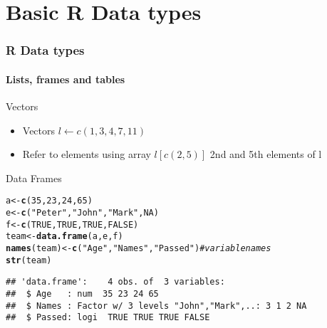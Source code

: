 \documentclass{article}\usepackage[]{graphicx}\usepackage[]{color}
\makeatletter
\newcommand{\hlnum}[1]{\textcolor[rgb]{0.686,0.059,0.569}{#1}}%
\newcommand{\hlstr}[1]{\textcolor[rgb]{0.192,0.494,0.8}{#1}}%
\newcommand{\hlcom}[1]{\textcolor[rgb]{0.678,0.584,0.686}{\textit{#1}}}%
\newcommand{\hlstd}[1]{\textcolor[rgb]{0.345,0.345,0.345}{#1}}%
\newcommand{\hlkwb}[1]{\textcolor[rgb]{0.69,0.353,0.396}{#1}}%
\newcommand{\hlkwd}[1]{\textcolor[rgb]{0.737,0.353,0.396}{\textbf{#1}}}%
\newenvironment{kframe}{%
 \def\at@end@of@kframe{}%
 \ifinner\ifhmode%
  \def\at@end@of@kframe{\end{minipage}}%
  \begin{minipage}{\columnwidth}%
 \fi\fi%
 \def\FrameCommand##1{\hskip\@totalleftmargin \hskip-\fboxsep
 \colorbox{shadecolor}{##1}\hskip-\fboxsep
     \hskip-\linewidth \hskip-\@totalleftmargin \hskip\columnwidth}%
 \MakeFramed {\advance\hsize-\width
   \@totalleftmargin\z@ \linewidth\hsize
   \@setminipage}}%
 {\par\unskip\endMakeFramed%
 \at@end@of@kframe}
\newenvironment{knitrout}{}{} %
\makeatother
\begin{document}
\section*{Basic R Data types}
\begin{frame}[fragile]
  \frametitle{R Data types}
  \framesubtitle{Lists, frames and tables}
  \begin{block}{Vectors}
      \begin{itemize}
         \item  Vectors $l\leftarrow c(1,3,4,7,11)$
         \item  Refer to elements using array $l[c(2,5)]$ 2nd and 5th elements of l
    \end{itemize}
  \end{block}
  \begin{block}{Data Frames}
 \end{block} 
\begin{knitrout}
\color{fgcolor}\begin{kframe}
\begin{alltt}
\hlstd{a} \hlkwb{<-} \hlkwd{c}\hlstd{(}\hlnum{35}\hlstd{,}\hlnum{23}\hlstd{,}\hlnum{24}\hlstd{,}\hlnum{65}\hlstd{)}
\hlstd{e} \hlkwb{<-} \hlkwd{c}\hlstd{(}\hlstr{"Peter"}\hlstd{,} \hlstr{"John"}\hlstd{,} \hlstr{"Mark"}\hlstd{,} \hlnum{NA}\hlstd{)}
\hlstd{f} \hlkwb{<-} \hlkwd{c}\hlstd{(}\hlnum{TRUE}\hlstd{,}\hlnum{TRUE}\hlstd{,}\hlnum{TRUE}\hlstd{,}\hlnum{FALSE}\hlstd{)}
\hlstd{team} \hlkwb{<-} \hlkwd{data.frame}\hlstd{(a,e,f)}
\hlkwd{names}\hlstd{(team)} \hlkwb{<-} \hlkwd{c}\hlstd{(}\hlstr{"Age"}\hlstd{,}\hlstr{"Names"}\hlstd{,}\hlstr{"Passed"}\hlstd{)} \hlcom{# variable names}
\hlkwd{str}\hlstd{(team)}
\end{alltt}
\begin{verbatim}
## 'data.frame':	4 obs. of  3 variables:
##  $ Age   : num  35 23 24 65
##  $ Names : Factor w/ 3 levels "John","Mark",..: 3 1 2 NA
##  $ Passed: logi  TRUE TRUE TRUE FALSE
\end{verbatim}
\end{kframe}
\end{knitrout}
 
\end{frame}  
\end{document}
